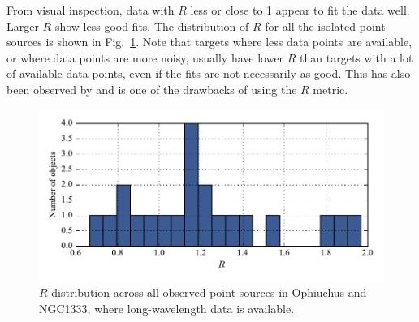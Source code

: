 From visual inspection, data with $R$ less or close to 1 appear to fit the data well. Larger $R$ show less good fits. The distribution of $R$ for all the isolated point sources is shown in Fig.~\ref{fig:Rdistr}. Note that targets where less data points are available, or where data points are more noisy, usually have lower $R$ than targets with a lot of available data points, even if the fits are not necessarily as good. This has also been observed by \citep{Furlan:2016df} and is one of the drawbacks of using the $R$ metric.

\begin{figure}[!h]
\begin{center}
\includegraphics[width=\textwidth]{Figures/Rdistr.pdf}
\vspace{-1cm}
\caption[Distribution of $R$]{$R$ distribution across all observed point sources in Ophiuchus and NGC1333, where long-wavelength data is available.}
\label{fig:Rdistr}
\end{center}
\end{figure}

